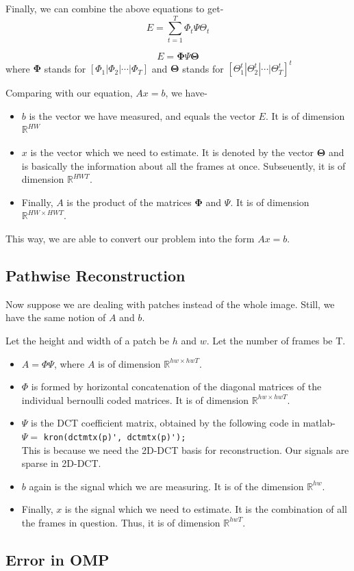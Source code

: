 \documentclass[a4paper,11pt]{article}
\numberwithin{definition}{section}
\numberwithin{mytheorem}{subsection}
\begin{document}
Finally, we can combine the above equations to get-
$$E = \sum \limits_{t=1}^T\Phi_t \Psi \Theta_t$$

$$E = \boldsymbol{\Phi} \Psi \boldsymbol{\Theta}$$
where $\boldsymbol{\Phi}$ stands for $[\Phi_1|\Phi_2|\cdots|\Phi_T]$ and $\boldsymbol{\Theta}$ stands for $[\Theta_1^t|\Theta_2^t|\cdots|\Theta_T^t]^t$

Comparing with our equation, $Ax = b$, we have-
\begin{itemize}
    \item $b$ is the vector we have measured, and equals the vector $E$. It is of dimension $\mathbb{R}^{HW}$
    \item $x$ is the vector which we need to estimate. It is denoted by the vector $\boldsymbol{\Theta}$ and is basically the information about all the frames at once. Subseuently, it is of dimension $\mathbb{R}^{HWT}$.
    \item Finally, $A$ is the product of the matrices $\boldsymbol{\Phi}$ and $\Psi$. It is of dimension $\mathbb{R}^{HW \times HWT}$.
\end{itemize}

This way, we are able to convert our problem into the form $Ax=b$.

\subsection{Pathwise Reconstruction}

Now suppose we are dealing with patches instead of the whole image. Still, we have the same notion of $A$ and $b$.

Let the height and width of a patch be $h$ and $w$. Let the number of frames be T.

\begin{itemize}
    \item $A = \Phi \Psi $, where $A$ is of dimension $\mathbb{R}^{hw \times hwT}$.
    \item $\Phi$ is formed by horizontal concatenation of the diagonal matrices of the individual bernoulli coded matrices. It is of dimension $\mathbb{R}^{hw \times hwT}$.
    \item $\Psi$ is the DCT coefficient matrix, obtained by the following code in matlab-\\
    $\Psi =$ \verb|kron(dctmtx(p)', dctmtx(p)');|\\
    This is because we need the 2D-DCT basis for reconstruction. Our signals are sparse in 2D-DCT.    
    \item $b$ again is the signal which we are measuring. It is of the dimension $\mathbb{R}^{hw}$.
    \item Finally, $x$ is the signal which we need to estimate. It is the combination of all the frames in question. Thus, it is of dimension $\mathbb{R}^{hwT}$.
\end{itemize}

\subsection{Error in OMP}
\end{document}
